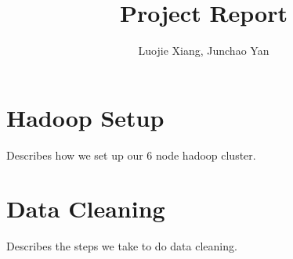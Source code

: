 \documentclass{article}
\begin{document}
\title{Project Report}
\author{Luojie Xiang, Junchao Yan}
\date{}
\maketitle

\section{Hadoop Setup}

Describes how we set up our 6 node hadoop cluster.

\section{Data Cleaning}

Describes the steps we take to do data cleaning.
\end{document}
